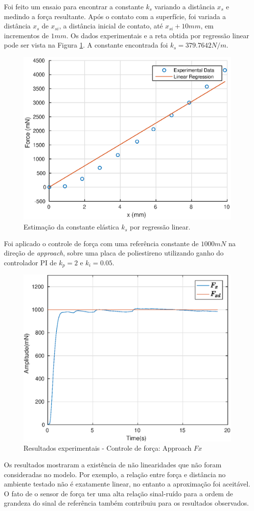Foi feito um ensaio para encontrar a constante $k_s$ variando a distância $x_s$ e medindo a força resultante. Após o contato com a superfície, foi variada a distância $x_s$ de $x_{si}$, a distância inicial de contato, até $x_{si} + 10mm$, em incrementos de $1mm$. Os dados experimentais e a reta obtida por regressão linear pode ser vista na Figura \ref{fig:ks_linreg}. A constante encontrada foi $k_s = 379.7642 N/m$.

\begin{figure}[!ht]
\centering
  \includegraphics[width=0.5\linewidth]{./img/ks_estimation.eps}
  \caption{Estimação da constante elástica $k_s$ por regressão linear.}
  \label{fig:ks_linreg}
\end{figure}%

Foi aplicado o controle de força com uma referência constante de $1000 mN$ na direção de \textit{approach}, sobre uma placa de poliestireno utilizando ganho do controlador PI de $k_p = 2$ e $k_i = 0.05$. 

 \begin{figure}[H]
  \centering
  \includegraphics[width=0.5\linewidth]{./img/force1000_kp2_ki005/Fx.eps}
  \caption{Resultados experimentais - Controle de força: Approach $Fx$}
  \label{fig:force_approach}
\end{figure}

Os resultados mostraram a existência de não linearidades que não foram consideradas no modelo. Por exemplo, a relação entre força e distância no ambiente testado não é exatamente linear, no entanto a aproximação foi aceitável. O fato de o sensor de força ter uma alta relação sinal-ruído para a ordem de grandeza do sinal de referência também contribuiu para os resultados observados. 

